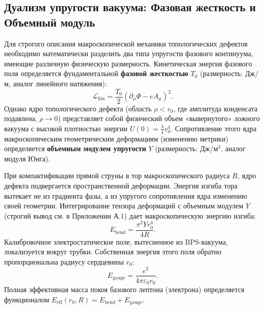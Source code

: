 \documentclass[11pt,a4paper]{article}
\begin{document}
	\subsection{Дуализм упругости вакуума: Фазовая жесткость и Объемный модуль}
	Для строгого описания макроскопической механики топологических дефектов необходимо математически разделить два типа упругости фазового континуума, имеющие различную физическую размерность.
	Кинетическая энергия фазового поля определяется фундаментальной \textbf{фазовой жесткостью} $T_0$ (размерность: Дж/м, аналог линейного натяжения):
	\begin{equation}
		\mathcal{L}_{\text{kin}} = \frac{T_0}{2} (\partial_\mu \Phi - e A_\mu)^2.
	\end{equation}
	Однако ядро топологического дефекта (область $\rho < r_0$, где амплитуда конденсата подавлена, $\rho \to 0$) представляет собой физический объем «вывернутого» ложного вакуума с высокой плотностью энергии $U(0) = \frac{\lambda}{4}v_0^4$. Сопротивление этого ядра макроскопическим геометрическим деформациям (изменению метрики) определяется \textbf{объемным модулем упругости} $Y$ (размерность: Дж/м$^3$, аналог модуля Юнга). 
	
	При компактификации прямой струны в тор макроскопического радиуса $R$, ядро дефекта подвергается пространственной деформации. Энергия изгиба тора вытекает не из градиента фазы, а из упругого сопротивления ядра изменению своей геометрии. Интегрирование тензора деформаций с объемным модулем $Y$ (строгий вывод см. в Приложении А.1) дает макроскопическую энергию изгиба:
	\begin{equation}
		E_{\text{bend}} = \frac{\pi^2 Y r_0^4}{4 R}.
	\end{equation}
	Калибровочное электростатическое поле, вытесненное из BPS-вакуума, локализуется вокруг трубки. Собственная энергия этого поля обратно пропорциональна радиусу сердцевины $r_0$:
	\begin{equation}
		E_{\text{gauge}} = \frac{e^2}{4\pi\varepsilon_0 r_0}.
	\end{equation}
	Полная эффективная масса покоя базового лептона (электрона) определяется функционалом $E_{\text{eff}}(r_0, R) = E_{\text{bend}} + E_{\text{gauge}}$.
	
\end{document}
